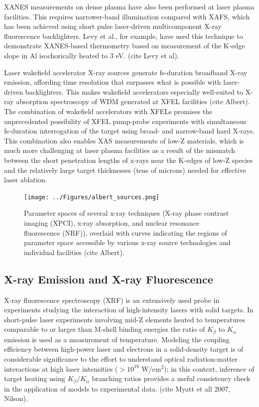 \documentclass [11pt, proquest, article] {uwthesis}[2016/11/22]
\begin{document}
XANES measurements on dense plasma have also been performed at laser plasma facilities. This requires narrower-band illumination compared with XAFS, which has been achieved using short pulse laser-driven multicomponent X-ray fluorescence backlighters. Levy et al., for example, have used this technique to demonstrate XANES-based thermometry based on measurement of the K-edge slope in Al isochorically heated to 3 eV. (cite Levy et al).

Laser wakefield accelerator X-ray sources generate fs-duration broadband X-ray emission, affording time resolution that surpasses what is possible with laser-driven backlighters. This makes wakefield accelerators especially well-suited to X-ray absorption spectroscopy of WDM generated at XFEL facilities (cite Albert). The combination of wakefield accelerators with XFELs promises the unprecedented possibility of XFEL pump-probe experiments with simultaneous fs-duration interrogation of the target using broad- and narrow-band hard X-rays. This combination also enables XAS measurements of low-Z materials, which is much more challenging at laser plasma facilities as a result of the mismatch between the short penetration lengths of x-rays near the K-edges of low-Z species and the relatively large target thicknesses (tens of microns) needed for effective laser ablation. 

\begin{figure}[h] 
\caption{Parameter spaces of several x-ray techniques (X-ray phase contrast imaging (XPCI), x-ray absorption, and nuclear resonance fluorescence (NRF)), overlaid with curves indicating the regions of parameter space accessible by various x-ray source technologies and individual facilities (cite Albert).}
\label{albert_sources}
\centering
\texttt{[image: ../Figures/albert\_sources.png]}
\end{figure}


\subsection{X-ray Emission and X-ray Fluorescence}
X-ray fluorescence spectroscopy (XRF) is an extensively used probe in experiments studying the interaction of high-intensity lasers with solid targets. In short-pulse laser experiments involving mid-Z elements heated to temperatures comparable to or larger than M-shell binding energies the ratio of $K_\beta$ to $K_\alpha$ emission is used as a measurement of temperature. Modeling the coupling efficiency between high-power laser and electrons in a solid-density target is of considerable significance to the effort to understand optical radiation-matter interactions at high laser intensities ($> 10^{19}$ W/cm$^2$); in this context, inference of target heating using $K_\beta/K_\alpha$ branching ratios provides a useful consistency check in the application of models to experimental data. (cite Myatt et all 2007, Nilson).
\end{document}
